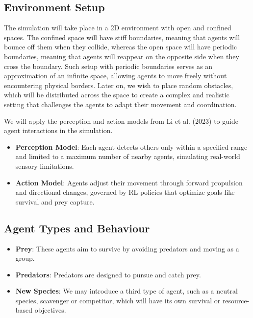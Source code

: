 \documentclass[9pt]{pnas-new}
\begin{document}
\subsection{Environment Setup}
The simulation will take place in a 2D environment with open and confined spaces. The confined space will have stiff boundaries, meaning
that agents will bounce off them when they collide, whereas the open space will have periodic boundaries, meaning that agents will reappear on the opposite side when they cross the boundary.
Such setup with periodic boundaries serves as an approximation of an infinite space, allowing agents to move freely without encountering physical borders. 
Later on, we wish to place random obstacles, which will be distributed across the space to create a complex and realistic setting that challenges the agents to adapt their movement and coordination. 

We will apply the perception and action models from Li et al. (2023) \cite{li2023predator} to guide agent interactions in the simulation.

\begin{itemize}
    \item \textbf{Perception Model}: Each agent detects others only within a specified range and limited to a maximum number of nearby agents, simulating real-world sensory limitations.
    \item \textbf{Action Model}: Agents adjust their movement through forward propulsion and directional changes, governed by RL policies that optimize goals like survival and prey capture.
\end{itemize}

\subsection{Agent Types and Behaviour}
\begin{itemize}
    \item \textbf{Prey}: These agents aim to survive by avoiding predators and moving as a group.
    \item \textbf{Predators}: Predators are designed to pursue and catch prey.
    \item \textbf{New Species}: We may introduce a third type of agent, such as a neutral species, scavenger or competitor, which will have its own survival or resource-based objectives.
\end{itemize}
\end{document}
